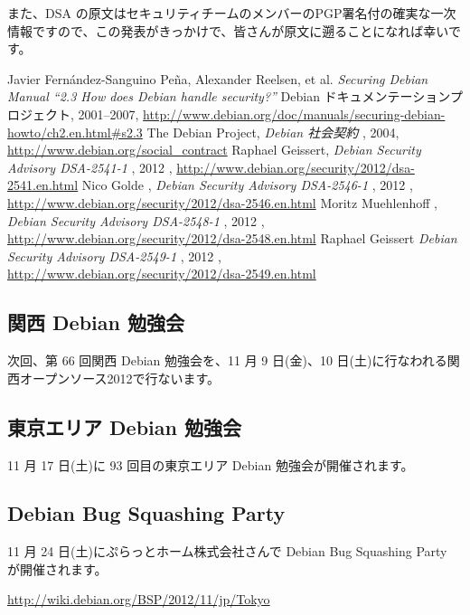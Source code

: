 \documentclass[mingoth,a4paper]{jsarticle}
\begin{document}
また、DSA の原文はセキュリティチームのメンバーのPGP署名付の確実な一次情報ですので、この発表がきっかけで、皆さんが原文に遡ることになれば幸いです。

\begin{thebibliography}{99}
Javier Fern\'{a}ndez-Sanguino Pe\~{n}a, Alexander Reelsen, et al.
 {\em Securing Debian Manual ``2.3 How does Debian handle security?''}
 Debian ドキュメンテーションプロジェクト,
 2001--2007,
\url{http://www.debian.org/doc/manuals/securing-debian-howto/ch2.en.html#s2.3}
        The Debian Project, {\em Debian 社会契約} ,
         2004,
            \url{http://www.debian.org/social_contract}
   Raphael Geissert,
 {\em Debian Security Advisory DSA-2541-1}
 , 2012
 , \url{http://www.debian.org/security/2012/dsa-2541.en.html}
   Nico Golde ,
 {\em Debian Security Advisory DSA-2546-1}
 , 2012
 , \url{http://www.debian.org/security/2012/dsa-2546.en.html}
   Moritz Muehlenhoff ,
 {\em Debian Security Advisory DSA-2548-1}
 , 2012
 , \url{http://www.debian.org/security/2012/dsa-2548.en.html}
   Raphael Geissert
 {\em Debian Security Advisory DSA-2549-1}
 , 2012
 , \url{http://www.debian.org/security/2012/dsa-2549.en.html}
\end{thebibliography}

\clearpage


\subsection{関西 Debian 勉強会}

次回、第 66 回関西 Debian 勉強会を、11 月 9 日(金)、10 日(土)に行なわれる関西オープンソース2012で行ないます。


\subsection{東京エリア Debian 勉強会}
11 月 17 日(土)に 93 回目の東京エリア Debian 勉強会が開催されます。


\subsection{Debian Bug Squashing Party}
11 月 24 日(土)にぷらっとホーム株式会社さんで Debian Bug Squashing Party が開催されます。

\url{http://wiki.debian.org/BSP/2012/11/jp/Tokyo}
\end{document}
